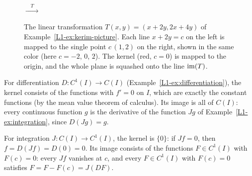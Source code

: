 \begin{figure}[ht]
    \centering
    \quad $\xrightarrow{\quad T \quad}$ \quad
    \caption[Kernel and image of a linear transformation]{The linear transformation $T(x, y) = (x + 2y, 2x + 4y)$ of Example~\ref{L1-ex:kerim-picture}. Each line $x + 2y = c$ on the left is mapped to the single point $c\,(1, 2)$ on the right, shown in the same color (here $c = -2$, $0$, $2$). The kernel (red, $c = 0$) is mapped to the origin, and the whole plane is squashed onto the line $\operatorname{im}(T)$.}
    \label{L1-fig:kernel-image}
\end{figure}

\begin{example}\label{L1-ex:D-kernel}
    For differentiation $D: C^1(I) \to C(I)$ (Example~\ref{L1-ex:differentiation}), the kernel consists of the functions with $f' = 0$ on $I$, which are exactly the constant functions (by the mean value theorem of calculus). Its image is all of $C(I)$: every continuous function $g$ is the derivative of the function $Jg$ of Example~\ref{L1-ex:integration}, since $D(Jg) = g$.

    For integration $J: C(I) \to C^1(I)$, the kernel is $\{0\}$: if $Jf = 0$, then $f = D(Jf) = D(0) = 0$. Its image consists of the functions $F \in C^1(I)$ with $F(c) = 0$: every $Jf$ vanishes at $c$, and every $F \in C^1(I)$ with $F(c) = 0$ satisfies $F = F - F(c) = J(DF)$.
\end{example}


